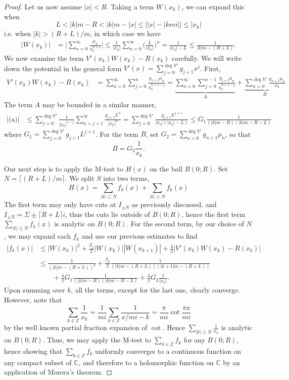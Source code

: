 \documentclass[10pt,a4paper]{amsart}
\newcommand{\cc}{\mathbb{C}}
\newcommand{\zz}{\mathbb{Z}}
\begin{document}
\begin{proof}
	Let us now assume $|x|<R$. Taking a term $W(x_k)$, we can expand this when 
	\[ L<|k|m-R<|k|m-|x| \leq \big||x|-|kmi|\big|\leq |x_k|  \]
	i.e. when $|k|>(R+L)/m$, in which case we have
	\begin{align*}
		|W(x_k)|&=\bigg|\sum_{n=0}^\infty \frac{\mu_n}{x_k^{n+1}}\bigg| \leq \frac{1}{|x_k|}\sum_{n=0}^\infty \bigg(\frac{L}{|x_k|}\bigg)^{n}  = \frac{1}{|x_k|-L} \leq \frac{1}{|k|m-(R+L)}.
	\end{align*}
	We now examine the term $V'(x_k)W(x_k)-R(x_k)$ carefully. We will write down the potential in the general form $V'(x)=\sum_{j=0}^{\deg V'}g_{j+1}x^j$. First,
	\begin{align}
		V'(x_k)W(x_k)-R(x_k) &= \sum_{n=0}^\infty\sum_{j=0}^n \frac{g_{j+1}\mu_n}{x_{k}^{n+1-j}} = \underbrace{\sum_{n=0}^\infty \sum_{j=0}^{n-1} \frac{g_{j+1}\mu_n}{x_k^{n+1-j}}}_{A}+\underbrace{\sum_{n=0}^{\deg V'} \frac{g_{n+1}\mu_n}{x_k}}_{B} \label{cotdecomp}
	\end{align}
	The term $A$ may be bounded in a similar manner,
	\begin{align*}
		|\text{(a)}| &\leq \sum_{j=0}^{\deg V'}\frac{1}{|x_k|^{1-j}}\sum_{n=j+1}^\infty \frac{g_{j+1}L^n}{|x_k|^{n}} = \sum_{j=0}^{\deg V'} \frac{g_{j+1}L^{j+1}}{|x_k|(|x_k|-L)}\leq G_1 \frac{1}{(|k|m-R)(|k|m-R-L)}
	\end{align*}
	where $G_1 = \sum_{j=0}^{\deg V'} g_{j+1}L^{j+1}$. For the term $B$, set $G_2 = \sum_{n=0}^{\deg V'}g_{n+1}\mu_n$, so that
	\[ B = G_2 \frac{1}{x_k}. \] 
	
	Our next step is to apply the M-test to $H(x)$ on the ball $B(0;R)$. Set $N=\lceil(R+L)/m\rceil$. We split $S$ into two terms,
	\[ H(x) = \sum_{|k|\leq N} f_k(x) + \sum_{|k|\geq N} f_k(x) \]
	The first term may only have cuts at $I_{\pm N}$ as previously discussed, and $I_{\pm N} = \Sigma \pm \lceil R+L\rceil i$, thus the cuts lie outside of $B(0;R)$, hence the first term $\sum_{|k|\leq N} f_k(x)$ is analytic on $B(0;R)$. For the second term, by our choice of $N$, we may expand each $f_k$ and use our previous estimates to find 
	\begin{align}
		|f_k(x)| &\leq |W(x_k)|^2 + \frac{\beta_2}{2}|W(x_k)||W(x_{k+1})| + \frac{4}{\beta}|V'(x_k)W(x_k)-R(x_k)| \nonumber\\
		&\leq \frac{1}{(|k|m-(R+L))^2}+\frac{\beta_2}{2}\frac{1}{(|k|m-(R+L))(|k+1|m-(R+L))}\nonumber\\&\qquad+\frac{4}{\beta}G_1\frac{1}{(|k|m-R)(|k|m-R-L)} + \frac{4}{\beta}G_2 \frac{1}{|x_k|}. \label{fbound}
	\end{align} 
	Upon summing over $k$, all the terms, except for the last one, clearly converge. However, note that
	\[ \sum_{k\in\zz} \frac{1}{x_k} = \frac{1}{mi}\sum_{k\in\zz} \frac{1}{x/mi-k} = \frac{\pi}{mi}\cot\frac{\pi x}{mi} \]
	by the well known partial fraction expansion of $\cot$. Hence $\sum_{|k|\geq N} \frac{1}{x_k}$ is analytic on $B(0;R)$. Thus, we may apply the M-test to $\sum_{k\in\zz} f_k$ for any $B(0;R)$, hence showing that $\sum_{k\in\zz} f_k$ uniformly converges to a continuous function on any compact subset of $\cc$, and therefore to a holomorphic function on $\cc$ by an application of Morera's theorem.
\end{proof}
\end{document}
